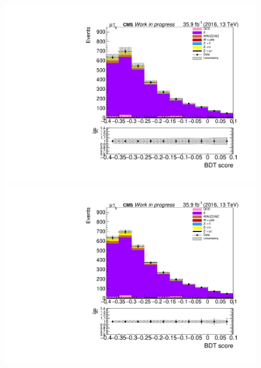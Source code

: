 \begin{figure}[htp]
	\begin{multicols}{2}
		\includegraphics[width=\linewidth]{plots/mt/TT_CR_prefit.pdf}\par 
		\includegraphics[width=\linewidth]{plots/mt/TT_CR_postfit.pdf}\par
	\end{multicols}	


\end{figure}
